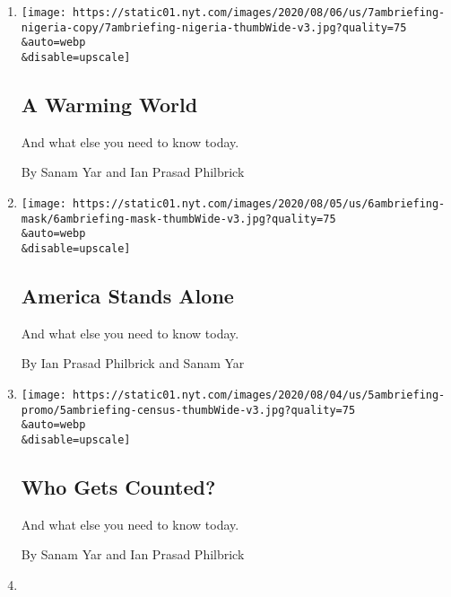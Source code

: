 \begin{enumerate}
\def\labelenumi{\arabic{enumi}.}
\item
  \href{/2020/08/07/briefing/coronavirus-suffrage-tiktok-your-friday-briefing.html}{}

  \texttt{[image: https://static01.nyt.com/images/2020/08/06/us/7ambriefing-nigeria-copy/7ambriefing-nigeria-thumbWide-v3.jpg?quality=75\\\&auto=webp\\\&disable=upscale]}

  \hypertarget{a-warming-world}{%
  \subsection{A Warming World}\label{a-warming-world}}

  And what else you need to know today.

  By Sanam Yar and Ian Prasad Philbrick
\item
  \href{/2020/08/06/briefing/coronavirus-beirut-deutsche-bank-your-thursday-briefing.html}{}

  \texttt{[image: https://static01.nyt.com/images/2020/08/05/us/6ambriefing-mask/6ambriefing-mask-thumbWide-v3.jpg?quality=75\\\&auto=webp\\\&disable=upscale]}

  \hypertarget{america-stands-alone}{%
  \subsection{America Stands Alone}\label{america-stands-alone}}

  And what else you need to know today.

  By Ian Prasad Philbrick and Sanam Yar
\item
  \href{/2020/08/05/briefing/beirut-isaias-cori-bush-your-wednesday-briefing.html}{}

  \texttt{[image: https://static01.nyt.com/images/2020/08/04/us/5ambriefing-promo/5ambriefing-census-thumbWide-v3.jpg?quality=75\\\&auto=webp\\\&disable=upscale]}

  \hypertarget{who-gets-counted}{%
  \subsection{Who Gets Counted?}\label{who-gets-counted}}

  And what else you need to know today.

  By Sanam Yar and Ian Prasad Philbrick
\item
  \href{/2020/08/04/briefing/coronavirus-relief-primary-elections-isaias-your-tuesday-briefing.html}{}


\end{enumerate}
